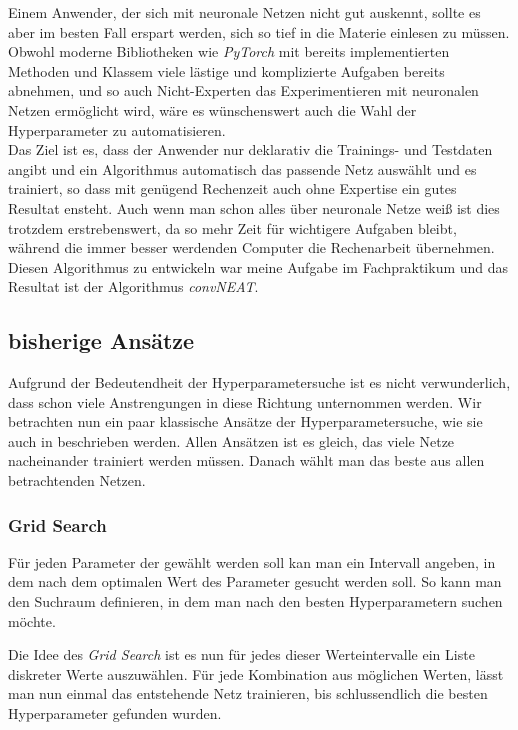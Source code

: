\documentclass[]{scrartcl}
\begin{document}
		Einem Anwender, der sich mit neuronale Netzen nicht gut auskennt, sollte es aber im besten Fall erspart werden, sich so tief in die Materie einlesen zu müssen.
		Obwohl moderne Bibliotheken wie \textit{PyTorch} mit bereits implementierten Methoden und Klassem viele lästige und komplizierte Aufgaben bereits abnehmen,
		und so auch Nicht-Experten das Experimentieren mit neuronalen Netzen ermöglicht wird, wäre es wünschenswert auch die Wahl der Hyperparameter zu automatisieren.\\

		Das Ziel ist es, dass der Anwender nur deklarativ die Trainings- und Testdaten angibt und ein Algorithmus automatisch das passende Netz auswählt und
		es trainiert, so dass mit genügend Rechenzeit auch ohne Expertise ein gutes Resultat ensteht.
		Auch wenn man schon alles über neuronale Netze weiß ist dies trotzdem erstrebenswert, da so mehr Zeit für wichtigere Aufgaben bleibt,
		während die immer besser werdenden Computer die Rechenarbeit übernehmen. \\
		Diesen Algorithmus zu entwickeln war meine Aufgabe im Fachpraktikum und das Resultat ist der Algorithmus \textit{convNEAT}.

	\subsection{bisherige Ansätze}\label{ansatz}

		Aufgrund der Bedeutendheit der Hyperparametersuche ist es nicht verwunderlich, dass schon viele Anstrengungen in diese Richtung unternommen werden.
		Wir betrachten nun ein paar klassische Ansätze der Hyperparametersuche, wie sie auch in \cite{parameters} beschrieben werden.
		Allen Ansätzen ist es gleich, das viele Netze nacheinander trainiert werden müssen. Danach wählt man das beste aus allen betrachtenden Netzen.

		\subsubsection{Grid Search}\label{grid}

			Für jeden Parameter der gewählt werden soll kan man ein Intervall angeben, in dem nach dem optimalen Wert des Parameter gesucht werden soll.
			So kann man den Suchraum definieren, in dem man nach den besten Hyperparametern suchen möchte.
			
			Die Idee des \textit{Grid Search} ist es nun für jedes dieser Werteintervalle ein Liste diskreter Werte auszuwählen.
			Für jede Kombination aus möglichen Werten, lässt man nun einmal das entstehende Netz trainieren, bis schlussendlich die besten Hyperparameter gefunden wurden.
\end{document}
